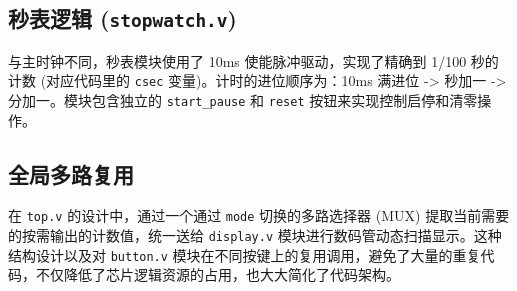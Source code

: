 \documentclass[12pt, a4paper]{ctexart}
\begin{document}
\subsection{秒表逻辑 (\texttt{stopwatch.v})}
与主时钟不同，秒表模块使用了 10ms 使能脉冲驱动，实现了精确到 1/100 秒的计数 (对应代码里的 \texttt{csec} 变量)。计时的进位顺序为：10ms 满进位 -> 秒加一 -> 分加一。模块包含独立的 \texttt{start\_pause} 和 \texttt{reset} 按钮来实现控制启停和清零操作。

\subsection{全局多路复用}
在 \texttt{top.v} 的设计中，通过一个通过 \texttt{mode} 切换的多路选择器 (MUX) 提取当前需要的按需输出的计数值，统一送给 \texttt{display.v} 模块进行数码管动态扫描显示。这种结构设计以及对 \texttt{button.v} 模块在不同按键上的复用调用，避免了大量的重复代码，不仅降低了芯片逻辑资源的占用，也大大简化了代码架构。
\end{document}

